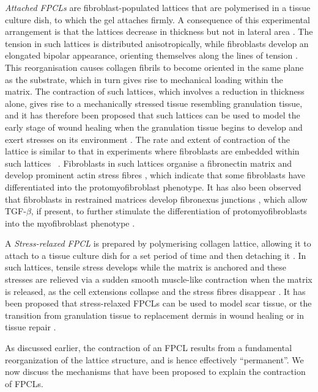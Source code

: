 \textit{Attached FPCLs} are fibroblast-populated lattices that are polymerised in a tissue culture dish, to which the gel attaches firmly. A consequence of this experimental arrangement is that the lattices decrease in thickness but not in lateral area \citep{Grinnell1984,Guidry1985}. The tension in such lattices is distributed anisotropically, while fibroblasts develop an elongated bipolar appearance, orienting themselves along the lines of tension \citep{Stopak1982,Bellows1982,Grinnell1994,Tamariz2002}. This reorganisation causes collagen fibrils to become oriented in the same plane as the substrate, which in turn gives rise to mechanical loading within the matrix. The contraction of such lattices, which involves a reduction in thickness alone, gives rise to a mechanically stressed tissue resembling granulation tissue, and it has therefore been proposed that such lattices can be used to model the early stage of wound healing when the granulation tissue begins to develop and exert stresses on its environment \citep{Grinnell1994}. The rate and extent of contraction of the lattice is similar to that in experiments where fibroblasts are embedded within such lattices~ \citep{Grinnell1984,Guidry1985,Guidry1986}. Fibroblasts in such lattices organise a fibronectin matrix and develop prominent actin stress fibres \citep{Farsi1984,Mochitate1991,Halliday1995}, which indicate  that some fibroblasts have differentiated into the protomyofibroblast phenotype. It has also been observed that fibroblasts in restrained matrices develop fibronexus junctions \citep{Tomasek2002}, which allow TGF-$\beta$, if present, to further stimulate the differentiation of protomyofibroblasts into the myofibroblast phenotype \citep{Arora1999,Vaughn2000}.

A \textit{Stress-relaxed FPCL} is prepared by polymerising collagen lattice, allowing it to attach to a tissue culture dish for a set period of time and then detaching it \citep{Tomasek1992}. In such lattices, tensile stress develops while the matrix is anchored and these stresses are relieved via a sudden smooth muscle-like contraction when the matrix is released, as the cell extensions collapse and the stress fibres disappear \citep{Mochitate1991,Tomasek1992,Lin1997}. It has been proposed that stress-relaxed FPCLs can be used to model scar tissue, or the transition from granulation tissue to replacement dermis in wound healing or in tissue repair \citep{Carlson2004}.

As discussed earlier, the contraction of an FPCL results from a fundamental reorganization of the lattice structure, and is hence effectively ``permanent''. We now discuss the mechanisms that have been proposed to explain the contraction of FPCLs.

